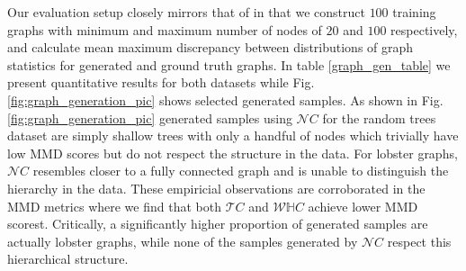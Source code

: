 Our evaluation setup closely mirrors that of \cite{liao2019efficient} in that we construct $100$ training graphs with minimum and maximum number of nodes of $20$ and $100$ respectively, and calculate mean maximum discrepancy between distributions of graph statistics for generated and ground truth graphs. In table \ref{graph_gen_table} we present quantitative results for both datasets while Fig. \ref{fig:graph_generation_pic} shows selected generated samples. As shown in Fig. \ref{fig:graph_generation_pic} generated samples using $\mathcal{N}C$ for the random trees dataset are simply shallow trees with only a handful of nodes which trivially have low MMD scores but do not respect the structure in the data. For lobster graphs, $\mathcal{N}C$ resembles closer to a fully connected graph and is unable to distinguish the hierarchy in the data. These empiricial observations are corroborated in the MMD metrics where we find that both $\mathcal{T}C$ and $\mathcal{W}\mathbb{H}C$ achieve lower MMD scorest. Critically, a significantly higher proportion of generated samples are actually lobster graphs, while none of the samples generated by $\mathcal{N}C$ respect this hierarchical structure. 

